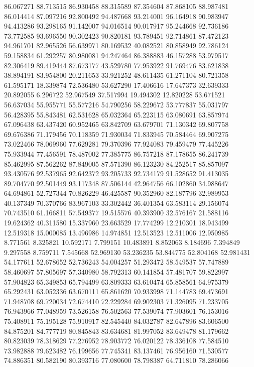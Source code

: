 86.067271
88.713515
86.930458
88.315589
87.354604
87.868105
88.987481
86.014414
87.097216
92.800492
94.487668
93.214001
96.164918
90.983947
94.413286
93.298165
91.142007
94.016514
90.017917
95.244668
92.736186
73.772585
93.696550
90.302423
90.820181
93.789451
92.714861
87.472123
94.961701
82.965526
56.639971
80.169532
40.082521
80.858949
92.786124
59.158834
61.292257
80.980081
94.247464
86.388883
46.157288
53.979517
82.306419
89.419444
87.673177
43.529780
77.953922
91.769476
83.621838
38.894191
83.954800
20.211653
33.921252
48.611435
61.271104
80.721358
61.595171
18.339874
72.536480
53.627290
17.406616
17.647373
32.639333
20.892055
6.296722
52.967549
37.517994
19.494302
12.820228
53.671521
56.637034
55.955771
55.577216
54.790256
58.229672
53.777837
55.031797
56.428395
55.843481
62.531628
65.032364
65.223115
63.080691
63.857974
67.096438
63.437420
60.952465
63.842709
63.679701
71.130342
69.807758
69.676386
71.179456
70.118359
71.930034
71.833945
70.584464
69.907275
73.022466
78.069960
77.629281
79.370396
77.924083
79.459479
77.445226
75.933944
77.456591
78.487002
77.385775
86.757218
87.178655
86.241739
85.462995
87.562262
87.849005
87.571390
86.123230
84.252517
85.857097
93.430576
92.537965
92.642372
93.205733
92.734179
91.528652
91.413035
89.704770
92.501449
93.117348
87.506144
42.964756
66.102860
34.988647
64.694861
52.727344
70.826229
46.425587
90.352960
82.187796
32.989953
40.137349
70.370766
83.967103
33.302442
36.401354
63.583114
29.156074
70.743510
61.166811
57.549377
19.515576
40.393900
32.576167
21.588116
19.624362
40.311580
15.337960
23.663529
17.774299
12.210301
18.943499
12.519318
15.000085
13.496986
14.974851
12.513523
12.511006
12.950985
8.771561
8.325821
10.592171
7.799151
10.483891
8.852063
8.184696
7.394849
9.297558
8.759711
7.545668
52.969130
53.236235
53.844775
52.804168
52.981431
54.177611
52.678652
52.736243
54.004257
51.293472
58.549537
57.747889
58.460697
57.805697
57.340980
58.792313
60.141854
57.481707
59.822997
57.904823
65.349853
65.794499
63.809333
63.610474
65.858561
64.975379
65.292431
63.052336
63.670111
65.861620
70.933998
71.144783
69.473691
71.948708
69.720034
72.674410
72.229284
69.902303
71.326095
71.233705
76.943966
77.048959
73.526158
76.502563
77.539074
77.903601
76.153016
75.408911
75.195128
75.910917
82.545440
84.032787
82.647896
83.606500
84.875201
84.777719
80.845843
83.634681
81.997052
83.649478
81.179662
80.823039
78.318629
77.276952
78.903772
76.020122
78.336108
77.584510
73.982888
79.623482
76.199656
77.745341
83.137461
76.956160
71.530577
74.886351
80.582190
80.393716
77.080600
78.798387
64.711810
78.286066

